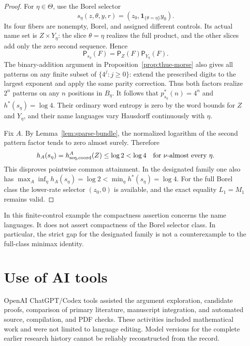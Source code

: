 \documentclass[11pt,reqno]{amsart}
\numberwithin{equation}{section}
\theoremstyle{definition}
\theoremstyle{definition}
\newcommand{\Patt}{\mathsf P}
\newcommand{\one}{\mathbf 1}
\begin{document}
\begin{proof}
For $\eta\in\Theta$, use the Borel selector
\[
 s_\eta(z,\theta,y,r)=(z_0,\one_{\{\theta=\eta\}}y_0).
\]
Its four fibers are nonempty, Borel, and assigned different
controls. Its actual name set is $Z\times Y_\eta$:
the slice $\theta=\eta$ realizes the full product, and the
other slices add only the zero second sequence. Hence
\[
 \Patt_{s_\eta}(F)=\Patt_Z(F)\Patt_{Y_\eta}(F).
\]
The binary-addition argument in Proposition~\ref{prop:thue-morse}
also gives all patterns on any finite subset of
$\{4^j:j\ge0\}$: extend the prescribed digits to the largest
exponent and apply the same parity correction. Thus both factors
realize $2^n$ patterns on any $n$ positions in $B_\eta$.
It follows that $p_{s_\eta}^*(n)=4^n$ and $h^*(s_\eta)=\log4$.
Their ordinary word entropy is zero by the word bounds for
$Z$ and $Y_\eta$, and their name languages vary Hausdorff
continuously with $\eta$.

Fix $A$. By Lemma~\ref{lem:sparse-bundle}, the normalized
logarithm of the second pattern factor tends to zero almost
surely. Therefore
\[
 h_A(s_\eta)=h_{\rm seq,coord}^A(Z)\le\log2<\log4
 \quad\text{for }\nu\text{-almost every }\eta.
\]
This disproves pointwise common attainment. In the designated
family one also has
$\max_A\inf_\eta h_A(s_\eta)=\log2<\min_\eta h^*(s_\eta)=\log4$.
For the full Borel class the lower-rate selector $(z_0,0)$
is available, and the exact equality $L_1=M_1$ remains valid.
\end{proof}

In this finite-control example the compactness assertion concerns
the name languages. It does not assert compactness of the Borel
selector class. In particular, the strict gap for the designated
family is not a counterexample to the full-class minimax identity.


\section*{Use of AI tools}
OpenAI ChatGPT/Codex tools assisted the argument exploration,
candidate proofs, comparison of primary literature, manuscript
integration, and automated source, compilation, and PDF checks.
These activities included mathematical work and were not limited
to language editing. Model versions for the complete earlier
research history cannot be reliably reconstructed from the record.
\end{document}
